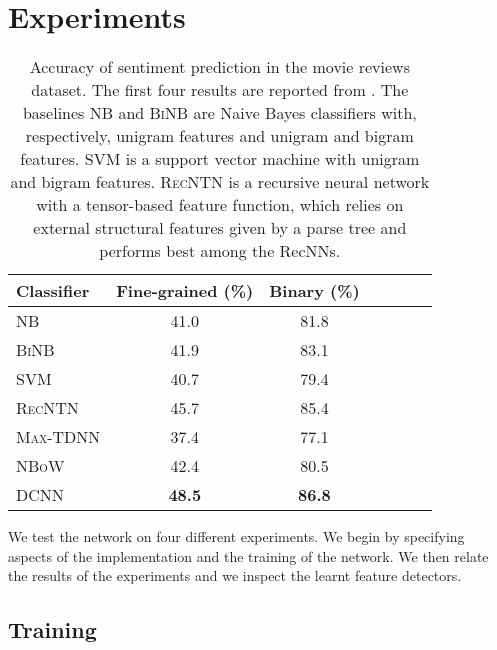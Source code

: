 \documentclass[11pt]{article}
\begin{document}
\section{Experiments}
\label{exp}
\begin{table}
\label{exp:sent}
\centering
\small
\begin{tabular}{ l  c  c  c  c  c c  } 
\toprule
 Classifier &  Fine-grained (\%) & Binary (\%) \\
\midrule
\textsc{NB}  & 41.0 & 81.8 \\ \midrule
\textsc{BiNB} & 41.9 & 83.1 \\ \midrule
\textsc{SVM}   & 40.7 & 79.4 \\ \midrule
\textsc{RecNTN}&  45.7 & 85.4 \\ \midrule 
\textsc{Max-TDNN} & 37.4 & 77.1 \\ \midrule
\textsc{NBoW} & 42.4 &  80.5 \\ \midrule
\textsc{DCNN} & \textbf{48.5} & \textbf{86.8} \\ \midrule
\bottomrule
\end{tabular}
\caption{Accuracy of sentiment prediction in the movie reviews dataset. The first four results are reported from . The baselines \textsc{NB} and \textsc{BiNB} are Naive Bayes classifiers with, respectively, unigram features and unigram and bigram features. \textsc{SVM} is a support vector machine with unigram and bigram features. \textsc{RecNTN} is a recursive neural network with a tensor-based feature function, which relies on external structural features given by a parse tree and performs best among the RecNNs. }
\vspace{-0.5cm}
\end{table}

We test the network on four different experiments. We begin by specifying aspects of the implementation and the training of the network. We then relate the results of the experiments and we inspect the learnt feature detectors.

\subsection{Training}
\end{document}
